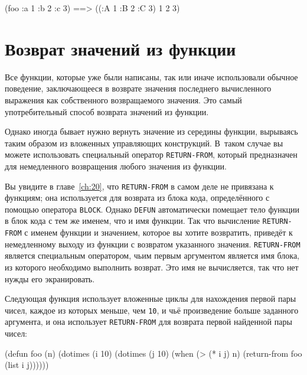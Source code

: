 \begin{myverb}
(foo :a 1 :b 2 :c 3)  ==> ((:A 1 :B 2 :C 3) 1 2 3)
\end{myverb}

\section{Возврат значений из функции}

Все функции, которые уже были написаны, так или иначе использовали обычное поведение,
заключающееся в возврате значения последнего вычисленного выражения как собственного
возвращаемого значения.  Это самый употребительный способ возврата значений из функции.

Однако иногда бывает нужно вернуть значение из середины функции, вырываясь таким образом
из вложенных управляющих конструкций.  В~таком случае вы можете использовать специальный
оператор \lstinline{RETURN-FROM}, который предназначен для немедленного возвращения любого
значения из функции.

Вы увидите в главе~\ref{ch:20}, что \lstinline{RETURN-FROM} в самом деле не привязана к функциям; она
используется для возврата из блока кода, определённого с помощью оператора \lstinline{BLOCK}.
Однако \lstinline{DEFUN} автоматически помещает тело функции в блок кода с тем же именем, что и
имя функции.  Так что вычисление \lstinline{RETURN-FROM} с именем функции и значением, которое вы
хотите возвратить, приведёт к немедленному выходу из функции с возвратом указанного
значения.  \lstinline{RETURN-FROM} является специальным оператором, чьим первым аргументом
является имя блока, из которого необходимо выполнить возврат.  Это имя не вычисляется, так
что нет нужды его экранировать.

Следующая функция использует вложенные циклы для нахождения первой пары чисел, каждое из
которых меньше, чем \lstinline{10}, и чьё произведение больше заданного аргумента, и она использует
\lstinline{RETURN-FROM} для возврата первой найденной пары чисел:

\begin{myverb}
(defun foo (n)
  (dotimes (i 10)
    (dotimes (j 10)
      (when (> (* i j) n)
        (return-from foo (list i j))))))
\end{myverb}

